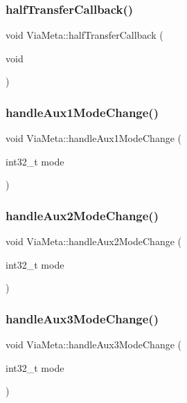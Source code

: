 \subsubsection{\texorpdfstring{half\+Transfer\+Callback()}{halfTransferCallback()}}
{\footnotesize\ttfamily void Via\+Meta\+::half\+Transfer\+Callback (\begin{DoxyParamCaption}\item[{void}]{ }\end{DoxyParamCaption})}

\mbox{\label{class_via_meta_a0239a011fd549aa363d68c7fcc5f5d91}} 
\subsubsection{\texorpdfstring{handle\+Aux1\+Mode\+Change()}{handleAux1ModeChange()}}
{\footnotesize\ttfamily void Via\+Meta\+::handle\+Aux1\+Mode\+Change (\begin{DoxyParamCaption}\item[{int32\+\_\+t}]{mode }\end{DoxyParamCaption})}

\mbox{\label{class_via_meta_a8b637a702d3e12878b6d3e40c11309d1}} 
\subsubsection{\texorpdfstring{handle\+Aux2\+Mode\+Change()}{handleAux2ModeChange()}}
{\footnotesize\ttfamily void Via\+Meta\+::handle\+Aux2\+Mode\+Change (\begin{DoxyParamCaption}\item[{int32\+\_\+t}]{mode }\end{DoxyParamCaption})}

\mbox{\label{class_via_meta_aa13d82e4b9811d169ac68aeb0cc05850}} 
\subsubsection{\texorpdfstring{handle\+Aux3\+Mode\+Change()}{handleAux3ModeChange()}}
{\footnotesize\ttfamily void Via\+Meta\+::handle\+Aux3\+Mode\+Change (\begin{DoxyParamCaption}\item[{int32\+\_\+t}]{mode }\end{DoxyParamCaption})}


